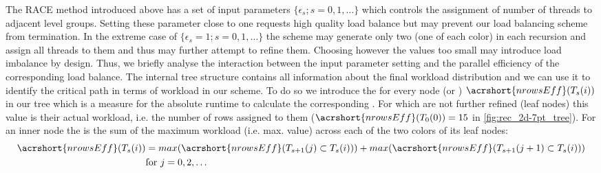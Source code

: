 

The \acrshort{RACE} method introduced above has a set of input parameters $\{\epsilon_s; s=0,1,\ldots\}$ which controls the assignment of number of threads to adjacent level groups. Setting these parameter close to one requests high quality load balance but may prevent our load balancing scheme from termination. In the extreme case of $\{\epsilon_s=1; s=0,1,\ldots\}$ the scheme may generate only two \levelGroups (one of each color) in each recursion and assign all threads to them and thus may further attempt to refine them.  Choosing however the values too small may introduce load imbalance by design.
Thus, we briefly analyse the interaction between the input parameter setting and the parallel efficiency of the corresponding load balance.  The internal tree structure contains all information about the final workload distribution and we can use it to identify the critical path in terms of workload in our scheme. To do so we introduce the \effRow for every node (or \levelGroup) $\acrshort{nrowsEff}(T_s(i))$  in our tree which is a measure for the absolute runtime to calculate the corresponding \levelGroup. For \levelGroups which are not further refined (leaf nodes) this value is their actual workload, i.e. the number of rows assigned to them ($\acrshort{nrowsEff}(T_0(0)) = 15$ in \cref{fig:rec_2d-7pt_tree}). For an inner node the \effRow  is the sum of the maximum workload (i.e. max. \effRow value) across each of the two colors of its leaf nodes:
\begin{align*}
\acrshort{nrowsEff}(T_s(i)) &= max(\acrshort{nrowsEff}(T_{s+1}(j) \subset T_s(i))) + max(\acrshort{nrowsEff}(T_{s+1}(j+1) \subset T_s(i)))\\
 & \text{for } j=0,2,\ldots
\end{align*}
